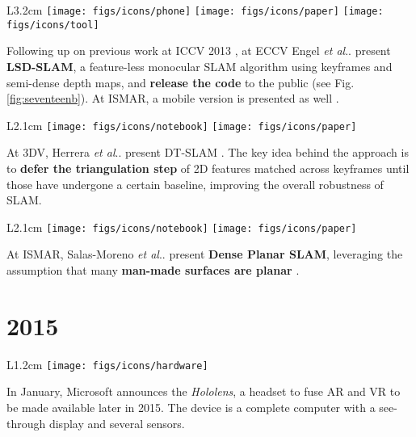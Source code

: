 \documentclass[12pt,a4paper]{article}
\makeatletter
\DeclareRobustCommand\onedot{\futurelet\@let@token\@onedot}
\def\@onedot{\ifx\@let@token.\else.\null\fi\xspace}
\def\etal{\emph{et al}\onedot}
\makeatother
\begin{document}
\vspace{0.1in}

\begin{wrapfigure}{L}{3.2cm}
	\vspace{-15pt}	
	\texttt{[image: figs/icons/phone]}
	\texttt{[image: figs/icons/paper]}
	\texttt{[image: figs/icons/tool]}
	\vspace{-25pt}		
\end{wrapfigure} 
\noindent Following up on previous work at ICCV 2013 \cite{Engel13}, at ECCV Engel \etal present \textbf{LSD-SLAM}, a feature-less monocular SLAM algorithm using keyframes and semi-dense depth maps, and \textbf{release the code} to the public \cite{engel14eccv} (see Fig.\ref{fig:seventeenb}). At ISMAR, a mobile version is presented as well \cite{schoeps14ismar}.

\vspace{0.1in}

\begin{wrapfigure}{L}{2.1cm}
	\vspace{-10pt}	
	\texttt{[image: figs/icons/notebook]}
	\texttt{[image: figs/icons/paper]}
	\vspace{-25pt}		
\end{wrapfigure} 
\noindent At 3DV, Herrera \etal present DT-SLAM \cite{Herrera14}. The key idea behind the approach is to \textbf{defer the triangulation step} of  2D features matched across keyframes until those have undergone a certain baseline, improving the overall robustness of SLAM.

\vspace{0.1in}

\begin{wrapfigure}{L}{2.1cm}
	\vspace{-10pt}	
	\texttt{[image: figs/icons/notebook]}
	\texttt{[image: figs/icons/paper]}
	\vspace{-20pt}		
\end{wrapfigure} 
\noindent At ISMAR, Salas-Moreno \etal present \textbf{Dense Planar SLAM}, leveraging the assumption that many \textbf{man-made surfaces are planar} \cite{SalasMoreno14}.

\vspace{-5pt}
\section*{2015}

\begin{wrapfigure}{L}{1.2cm}
	\vspace{-15pt}	
	\texttt{[image: figs/icons/hardware]}
	\vspace{-20pt}		
\end{wrapfigure} 
In January, Microsoft announces the \emph{Hololens}, a headset to fuse AR and VR  to be made available later in 2015. The device is a complete computer with a see-through display and several sensors. 
\end{document}
